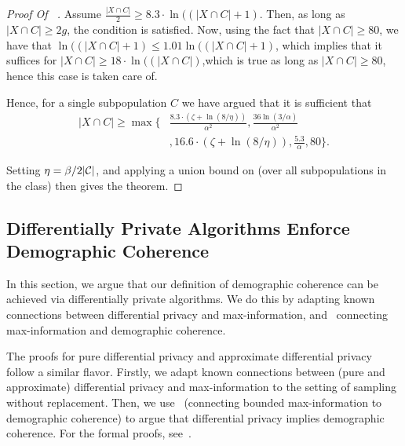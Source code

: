 \begin{proof}[Proof Of ~]
     Assume $ \frac{|X\cap C|}{2} \ge 8.3 \cdot\ln((|X\cap C|+1).$ Then, as long as $|X\cap C| \geq 2g$, the condition is satisfied. Now, using the fact that $|X \cap C| \geq 80$, we have that $\ln((|X\cap C|+1) \leq 1.01\ln((|X\cap C|+1)$, which implies that it suffices for
     $ |X\cap C| \ge 18\cdot\ln((|X\cap C|)$,which is true as long as $|X \cap C| \geq 80$, hence this case is taken care of. 

     Hence, for a single subpopulation $C$ we have argued that it is sufficient that
    \begin{align}
        |X \cap C| \geq \max\Big\{ & \frac{8.3 \cdot (\zeta + \ln(8/\eta))}{\alpha^2}, \frac{36\ln(3/\alpha)}{\alpha^2} \nonumber \\
        &, 16.6 \cdot (\zeta + \ln(8/\eta)), \frac{5.3}{\alpha}, 80\Big\}.
    \end{align}

    Setting $\eta = \beta/2|\mathcal{C}|$, and applying a union bound on  (over all subpopulations in the class) then gives the theorem.
\end{proof}



\subsection{Differentially Private Algorithms Enforce Demographic Coherence}\label{sec:dp-implies-coherence-enforcement}

In this section, we argue that our definition of demographic coherence can be achieved via differentially private algorithms. We do this by adapting known connections between differential privacy and max-information, and~ connecting max-information and demographic coherence. 

The proofs for pure differential privacy and approximate differential privacy follow a similar flavor. Firstly, we adapt known connections between (pure and approximate) differential privacy and max-information to the setting of sampling without replacement. 
Then, we use~
(connecting bounded max-information to demographic coherence) to argue that differential privacy implies demographic coherence. \ifnum{} For the formal proofs, see~. \fi 

